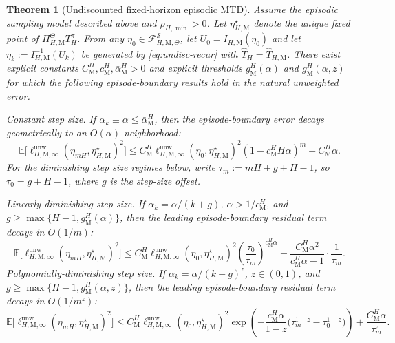 \documentclass{article}
\newtheorem{theorem}{Theorem}
\newcommand{\X}{\mathcal{S}}
\newcommand{\E}{\mathbb{E}}
\begin{document}
\begin{theorem}[Undiscounted fixed-horizon episodic MTD]\label{thm:undisc-mtd}
Assume the episodic sampling model described above and $\rho_{H,\min}>0$. Let $\eta_{H,\mathrm M}^\star$ denote the unique fixed point of $\Pi_{H,\mathrm M}^{\Theta} T_H^\pi$. From any $\eta_0\in\mathcal F_{H,\mathrm M,\Theta}^{\X}$, let $U_0=I_{H,\mathrm M}(\eta_0)$ and let $\eta_k := I_{H,\mathrm M}^{-1}(U_k)$ be generated by \eqref{eq:undisc-recur} with $\widehat T_{H} = \widehat T_{H,\mathrm M}$. There exist explicit constants $C^H_\mathrm M, c^H_\mathrm M, \bar \alpha ^H_\mathrm M > 0$ and explicit thresholds $g^H_\mathrm M(\alpha)$ and $g^H_\mathrm M(\alpha, z)$ for which the following episode-boundary results hold in the natural unweighted error.

\textup{Constant step size.} If $\alpha_k \equiv \alpha \le \bar \alpha^H_\mathrm M$, then the episode-boundary error decays geometrically to an $O(\alpha)$ neighborhood:
\begin{equation}
\E\bigl[\ell_{H, \mathrm M, \infty}^{\mathrm{unw}}(\eta_{mH}, \eta_{H,\mathrm M}^\star)^2 \bigr] \le C^{H}_\mathrm M \ell_{H,\mathrm M, \infty}^{\mathrm{unw}}(\eta_0, \eta_{H,\mathrm M}^\star)^2(1- c^{H}_\mathrm M H\alpha)^m + C^{H}_\mathrm M \alpha.
\end{equation}
For the diminishing step size regimes below, write $\tau_m := mH+g+H-1$, so $\tau_0 = g+H-1$, where $g$ is the step-size offset.

\textup{Linearly-diminishing step size.} If $\alpha_k = \alpha / (k+g)$, $\alpha > 1/c^{H}_\mathrm M$, and $g \ge \max\{H-1,g^{H}_\mathrm M(\alpha)\}$, then the leading episode-boundary residual term decays in $O(1/m)$:
\begin{equation}
\E\bigl[\ell_{H,\mathrm M, \infty}^{\mathrm{unw}}(\eta_{mH}, \eta_{H,\mathrm M}^\star)^2 \bigr] \le C^{H}_\mathrm M \ell_{H, \mathrm M, \infty}^{\mathrm{unw}}(\eta_0, \eta_{H,\mathrm M}^\star)^2\left(\frac{\tau_0}{\tau_m} \right)^{c^{H}_\mathrm M\alpha} + \frac{C^{H}_\mathrm M \alpha^2}{c^{H}_\mathrm M\alpha -1} \cdot \frac{1}{\tau_m}.
\end{equation}
\textup{Polynomially-diminishing step size.} If $\alpha_k = \alpha/(k+g)^z$, $z \in (0,1)$, and $g \ge \max\{H-1,g^{H}_\mathrm M(\alpha, z)\}$, then the leading episode-boundary residual term decays in $O(1/m^z)$:
\begin{equation}
\E\bigl[\ell_{H, \mathrm M, \infty}^{\mathrm{unw}}(\eta_{mH}, \eta_{H,\mathrm M}^\star)^2 \bigr] \le C^{H}_\mathrm M \ell_{H, \mathrm M, \infty}^{\mathrm{unw}}(\eta_0, \eta_{H,\mathrm M}^\star)^2\exp\left(-\frac{c^{H}_\mathrm M \alpha}{1-z} \bigl(\tau^{1-z}_m - \tau^{1-z}_0 \bigr) \right) + \frac{C^{H}_\mathrm M \alpha}{\tau_m^z}.
\end{equation}
\end{theorem}
\end{document}
